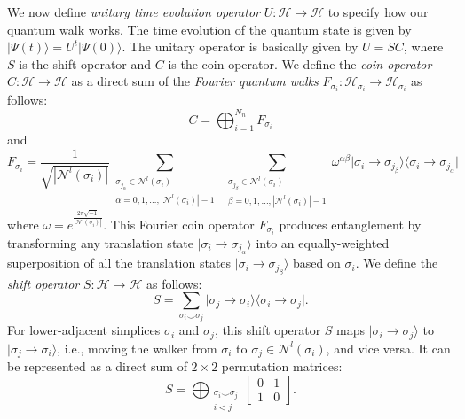 \documentclass[10pt, letterpaper]{article}
\begin{document}
We now define \textit{unitary time evolution operator} $U: \mathcal{H}\to\mathcal{H}$ to specify how our quantum walk works. The time evolution of the quantum state is given by $\vert\Psi(t)\rangle=U^{t}\vert\Psi(0)\rangle$. The unitary operator is basically given by $U=SC$, where $S$ is the shift operator and $C$ is the coin operator. We define the \textit{coin operator} $C: \mathcal{H}\to\mathcal{H}$ as a direct sum of the \textit{Fourier quantum walks} \cite{Mackay2002, Saito2019} $F_{\sigma_i}: \mathcal{H}_{\sigma_i}\to \mathcal{H}_{\sigma_i}$ as follows:
\begin{equation}
C = \bigoplus_{i=1}^{N_n} F_{\sigma_i}
\end{equation}
and
\begin{equation}
F_{\sigma_i} = \frac{1}{\sqrt{\left|\mathcal{N}^{l}(\sigma_i)\right|}} \sum_{\substack{\sigma_{j_\alpha} \in\mathcal{N}^{l}(\sigma_i) \\ \alpha=0,1,\ldots,|\mathcal{N}^{l}(\sigma_i)|-1}}~\sum_{\substack{\sigma_{j_\beta} \in\mathcal{N}^{l}(\sigma_i) \\ \beta=0,1,\ldots,|\mathcal{N}^{l}(\sigma_i)|-1}} \omega^{\alpha\beta} \vert\sigma_i\to\sigma_{j_\beta}\rangle \langle\sigma_i\to\sigma_{j_\alpha}\vert
\end{equation}
where $\omega=e^{\frac{2\pi\sqrt{-1}}{|\mathcal{N}^{l}(\sigma_i)|}}$. This Fourier coin operator $F_{\sigma_i}$ produces entanglement by transforming any translation state $\vert\sigma_i\to\sigma_{j_\alpha}\rangle$ into an equally-weighted superposition of all the translation states $\vert\sigma_i\to\sigma_{j_\beta}\rangle$ based on $\sigma_i$. We define the \textit{shift operator} $S: \mathcal{H}\to\mathcal{H}$ as follows:
\begin{equation}
S = \sum_{\sigma_i\smile\sigma_j} \vert\sigma_j\to\sigma_i\rangle \langle\sigma_i\to\sigma_j\vert.
\end{equation}
For lower-adjacent simplices $\sigma_i$ and $\sigma_j$, this shift operator $S$ maps $\vert\sigma_i\to\sigma_j\rangle$ to $\vert\sigma_j\to\sigma_i\rangle$, i.e., moving the walker from $\sigma_i$ to $\sigma_j\in \mathcal{N}^{l}(\sigma_i)$, and vice versa. It can be represented as a direct sum of $2\times2$ permutation matrices:
\begin{equation}
S = \bigoplus_{\substack{\sigma_i\smile\sigma_j \\ i<j}}
\begin{bmatrix}
0 & 1 \\
1 & 0
\end{bmatrix}.
\end{equation}
\end{document}
